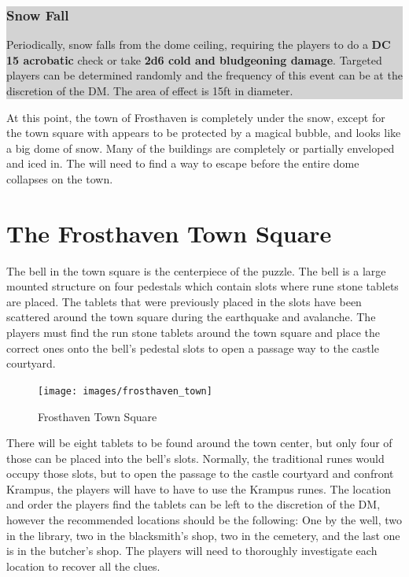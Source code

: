 \documentclass{article}
\begin{document}
\begin{multicols*}{2}
	\colorbox{lightgray}{\begin{minipage}{0.4\textwidth}
\subsubsection*{Snow Fall}
Periodically, snow falls from the dome ceiling, requiring the players to do a \textbf{DC 15 acrobatic} check or take \textbf{2d6 cold and bludgeoning damage}. Targeted players can be determined randomly and the frequency of this event can be at the discretion of the DM. The area of effect is 15ft in diameter.
\end{minipage}}
\break
	
	At this point, the town of Frosthaven is completely under the snow, except for the town square with appears to be protected by a magical bubble, and looks like a big dome of snow. Many of the buildings are completely or partially enveloped and iced in. The will need to find a way to escape before the entire dome collapses on the town. 

\section{The Frosthaven Town Square}
	The bell in the town square is the centerpiece of the puzzle. The bell is a large mounted structure on four pedestals which contain slots where rune stone tablets are placed. The tablets that were previously placed in the slots have been scattered around the town square during the earthquake and avalanche. The players must find the run stone tablets around the town square and place the correct ones onto the bell's pedestal slots to open a passage way to the castle courtyard.
	
	\begin{figure}
	\centering
	\texttt{[image: images/frosthaven\_town]}
	\caption{Frosthaven Town Square}
	\end{figure}
	
	
	
	There will be eight tablets to be found around the town center, but only four of those can be placed into the bell's slots. Normally, the traditional runes would occupy those slots, but to open the passage to the castle courtyard and confront Krampus, the players will have to have to use the Krampus runes. The location and order the players find the tablets can be left to the discretion of the DM, however the recommended locations should be the following: One by the well, two in the library, two in the blacksmith's shop, two in the cemetery, and the last one is in the butcher's shop. The players will need to thoroughly investigate each location to recover all the clues.
	

\end{multicols*}
\end{document}
